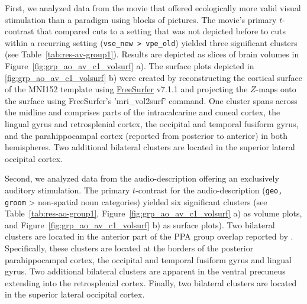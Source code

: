 \documentclass[english,11pt]{article}
\begin{document}


First, we analyzed data from the movie that offered ecologically more valid
visual stimulation than a paradigm using blocks of pictures.
The movie's primary $t$-contrast that compared cuts to a setting that was not
depicted before to cuts within a recurring setting (\texttt{vse\_new >
vpe\_old}) yielded three significant clusters (see
Table~\ref{tab:res-av-group1}).
Results are depicted as slices of brain volumes in Figure~\ref{fig:grp_ao_av_c1_volsurf} a).
The surface plots depicted in \ref{fig:grp_ao_av_c1_volsurf} b) were created by
reconstructing the cortical surface of the MNI152 template using
\href{https://surfer.nmr.mgh.harvard.edu}{FreeSurfer} v7.1.1
\citep{dale1999cortical} and projecting the $Z$-maps onto the surface using
FreeSurfer's 'mri\_vol2surf' command.
One cluster spans across the midline and comprises parts of the intracalcarine
and cuneal cortex, the lingual gyrus and retrosplenial cortex, the occipital and
temporal fusiform gyrus, and the parahippocampal cortex (reported from posterior
to anterior) in both hemispheres.
Two additional bilateral clusters are located in the superior lateral occipital
cortex.

Second, we analyzed data from the audio-description offering an exclusively
auditory stimulation.
The primary $t$-contrast for the audio-description (\texttt{geo, groom} >
non-spatial noun categories) yielded six significant clusters
(see Table~\ref{tab:res-ao-group1}, Figure~\ref{fig:grp_ao_av_c1_volsurf} a) as volume plots, and Figure~\ref{fig:grp_ao_av_c1_volsurf} b) as surface plots).
Two bilateral clusters are located in the anterior part of the PPA group overlap
reported by \citet{sengupta2016extension}.
Specifically, these clusters are located at the borders of the posterior
parahippocampal cortex, the occipital and temporal fusiform gyrus and lingual
gyrus.
Two additional bilateral clusters are apparent in the ventral precuneus
extending into the retrosplenial cortex.
Finally, two bilateral clusters are located in the superior lateral occipital
cortex.
\end{document}
